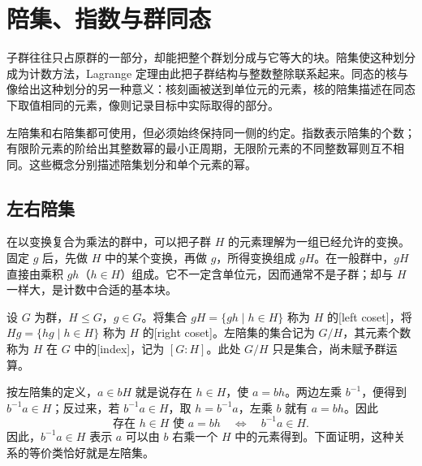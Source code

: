 
\section{陪集、指数与群同态}
\label{b1:sec:0202}

%
%

子群往往只占原群的一部分，却能把整个群划分成与它等大的块。陪集使这种划分成为计数方法，Lagrange 定理由此把子群结构与整数整除联系起来。同态的核与像给出这种划分的另一种意义：核刻画被送到单位元的元素，核的陪集描述在同态下取值相同的元素，像则记录目标中实际取得的部分。

\ProseParagraphBreak
左陪集和右陪集都可使用，但必须始终保持同一侧的约定。指数表示陪集的个数；有限阶元素的阶给出其整数幂的最小正周期，无限阶元素的不同整数幂则互不相同。这些概念分别描述陪集划分和单个元素的幂。

\subsection{左右陪集}
\label{b1:subsec:0202:01}

在以变换复合为乘法的群中，可以把子群 \(H\) 的元素理解为一组已经允许的变换。固定 \(g\) 后，先做 \(H\) 中的某个变换，再做 \(g\)，所得变换组成 \(gH\)。在一般群中，\(gH\) 直接由乘积 \(gh\)（\(h\in H\)）组成。它不一定含单位元，因而通常不是子群；却与 \(H\) 一样大，是计数中合适的基本块。

\begin{definition}\label{b1:def:coset-index}
	设 \(G\) 为群，\(H\leq G\)，\(g\in G\)。将集合 \(gH=\{gh\mid h\in H\}\) 称为 \(H\) 的[left coset]，将 \(Hg=\{hg\mid h\in H\}\) 称为 \(H\) 的[right coset]。左陪集的集合记为 \(G/H\)，其元素个数称为 \(H\) 在 \(G\) 中的[index]，记为 \([G:H]\)。此处 \(G/H\) 只是集合，尚未赋予群运算。
\end{definition}


按左陪集的定义，\(a\in bH\) 就是说存在 \(h\in H\)，使 \(a=bh\)。两边左乘 \(b^{-1}\)，便得到 \(b^{-1}a\in H\)；反过来，若 \(b^{-1}a\in H\)，取 \(h=b^{-1}a\)，左乘 \(b\) 就有 \(a=bh\)。因此
\[
	\text{存在 }h\in H\text{ 使 }a=bh \quad\Longleftrightarrow\quad b^{-1}a\in H.
\]
因此，\(b^{-1}a\in H\) 表示 \(a\) 可以由 \(b\) 右乘一个 \(H\) 中的元素得到。下面证明，这种关系的等价类恰好就是左陪集。

